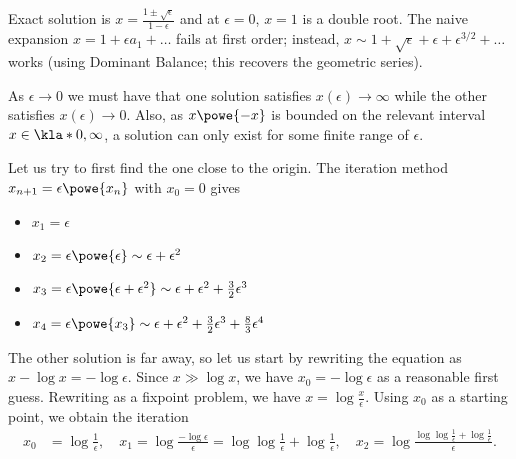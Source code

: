 \documentclass[english, parskip=full]{scrbook}
\newcommand{\example}[3]{\begin{tcolorbox}[colback=colorbackgroundexample,colframe=colorexample, breakable,enhanced,title={\textbf{#1}: #2.}]#3\end{tcolorbox}}
\begin{document}
\example{Another quadratic}{$(1-\epsilon)x^2 - 2x + 1 = 0$}{Exact solution is $x=\frac{1 \pm \sqrt{\epsilon}}{1 - \epsilon}$ and at $\epsilon=0$, $x=1$ is a double root.
The naive expansion $x=1+\epsilon a_1+\dots$ fails at first order; instead, $x\sim 1 + \sqrt{\epsilon} + \epsilon + \epsilon^{3/2} + \dots$ works (using Dominant Balance; this recovers the geometric series).
}
\example{Non-linear equation}{$x\powe{-x} = \epsilon$}{As $\epsilon\rightarrow 0$ we must have that one solution satisfies $x(\epsilon) \rightarrow \infty$ while the other satisfies $x(\epsilon) \rightarrow 0$.
Also, as $x\powe{-x}$ is bounded on the relevant interval $x\in\kla*{0,\infty}$, a solution can only exist for some finite range of $\epsilon$.

Let us try to first find the one close to the origin.
The iteration method $x_{n+1} = \epsilon \powe{x_n}$ with $x_0=0$ gives
\begin{itemize}
\item $x_1=\epsilon$
\item $x_2 = \epsilon\powe{\epsilon} \sim \epsilon + \epsilon^2$
\item $x_3 = \epsilon\powe{\epsilon + \epsilon^2} \sim \epsilon + \epsilon^2 + \frac{3}{2}\epsilon^3$
\item $x_4 = \epsilon\powe{x_3} \sim \epsilon + \epsilon^2 + \frac{3}{2}\epsilon^3 + \frac{8}{3}\epsilon^4$
\end{itemize}
The other solution is far away, so let us start by rewriting the equation as $x - \log x = -\log \epsilon$.
Since $x\gg \log x$, we have $x_0 = -\log \epsilon$ as a reasonable first guess.
Rewriting as a fixpoint problem, we have $x = \log \frac{x}{\epsilon}$.
Using $x_0$ as a starting point, we obtain the iteration
\begin{align}
x_0 &= \log\frac{1}{\epsilon}, \quad x_1 = \log \frac{-\log \epsilon}{\epsilon} = \log\log \frac{1}{\epsilon} + \log \frac{1}{\epsilon}, \quad x_2 = \log \frac{\log\log \frac{1}{\epsilon} + \log \frac{1}{\epsilon}}{\epsilon}.
\end{align}
}
\end{document}
